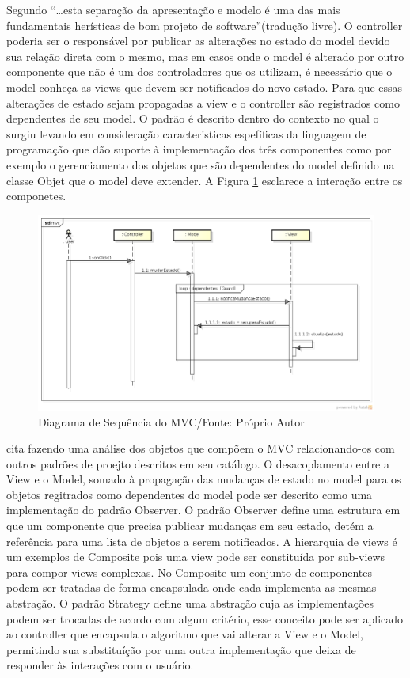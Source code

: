 Segundo  ``\ldots esta separação da
apresentação e modelo é uma das mais fundamentais herísticas de bom projeto
de software''(tradução livre).
O controller poderia ser o responsável por publicar as alterações no estado do
model devido sua relação direta com o mesmo, mas em casos onde o model é
alterado por outro componente que não é um dos controladores que os utilizam, é
necessário que o model conheça as views que devem ser notificados do novo
estado. Para que essas alterações de estado sejam propagadas a view e o
controller são registrados como dependentes de seu model. O padrão é descrito
dentro do contexto no qual o surgiu levando em consideração caracteristicas
espefíficas da  linguagem de programação que dão suporte à implementação dos
três componentes como por exemplo o gerenciamento dos objetos que são
dependentes do model definido na classe Objet que o model deve extender. A
Figura \ref{mvc_seq} esclarece a interação entre os componetes.

\begin{figure}[h]
	\centering
	\includegraphics[scale=0.5]{img/mvc_seq.png}
	\caption{Diagrama de Sequência do MVC/Fonte: Próprio Autor}
	\label{mvc_seq}
\end{figure}

 cita  fazendo uma análise dos
objetos que compõem o MVC relacionando-os com outros padrões de proejto
descritos em seu catálogo.
O desacoplamento entre a View e o Model, somado à propagação das mudanças de
estado no model para os objetos regitrados como dependentes do model pode ser
descrito como uma implementação do padrão Observer. O padrão Observer define uma
estrutura em que um componente que precisa publicar mudanças em seu estado, detém a
referência para uma lista de objetos a serem notificados. A hierarquia de views
é um exemplos de Composite pois uma view pode ser constituída por sub-views para
compor views complexas. No Composite  um conjunto de componentes podem ser
tratadas de forma encapsulada onde cada implementa as mesmas abstração. O padrão
Strategy define uma abstração cuja as implementações podem ser trocadas de
acordo com algum critério, esse conceito pode ser aplicado ao controller que
encapsula o algoritmo que vai alterar a View e o Model, permitindo sua
substituíção por uma outra implementação que deixa de responder às interações
com o usuário.

